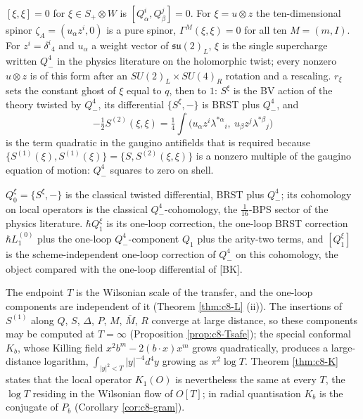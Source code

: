 \begin{remark}
$[\xi,\xi]=0$ for $\xi\in S_+\otimes W$ is $[Q^i_\alpha,Q^j_\beta]=0$. For $\xi=u\otimes z$ the ten-dimensional spinor $\zeta_A=(u_\alpha z^i,0)$ is a pure spinor, $\Gamma^M(\xi,\xi)=0$ for all ten $M=(m,I)$. For $z^i=\delta^i{}_4$ and $u_\alpha$ a weight vector of $\mathfrak{su}(2)_L$, $\xi$ is the single supercharge written $Q^4_-$ in the physics literature on the holomorphic twist; every nonzero $u\otimes z$ is of this form after an $SU(2)_L\times SU(4)_R$ rotation and a rescaling. $r_\xi$ sets the constant ghost of $\xi$ equal to $q$, then to $1$: $S^\xi$ is the BV action of the theory twisted by $Q^4_-$, its differential $\{S^\xi,-\}$ is BRST plus $Q^4_-$, and
\[
-\tfrac12S^{(2)}(\xi,\xi)=\tfrac14\int\big(u_\alpha z^i\lambda^{*\alpha}{}_i,\ u_\beta z^j\lambda^{*\beta}{}_j\big)
\]
is the term quadratic in the gaugino antifields that is required because $\{S^{(1)}(\xi),S^{(1)}(\xi)\}=\{S,S^{(2)}(\xi,\xi)\}$ is a nonzero multiple of the gaugino equation of motion: $Q^4_-$ squares to zero on shell.
\end{remark}

\begin{remark}
$Q^\xi_0=\{S^\xi,-\}$ is the classical twisted differential, BRST plus $Q^4_-$; its cohomology on local operators is the classical $Q^4_-$-cohomology, the $\tfrac1{16}$-BPS sector of the physics literature. $\hbar Q^\xi_1$ is its one-loop correction, the one-loop BRST correction $\hbar L_1^{(0)}$ plus the one-loop $Q^4_-$-component $Q_1$ plus the arity-two terms, and $[Q^\xi_1]$ is the scheme-independent one-loop correction of $Q^4_-$ on this cohomology, the object compared with the one-loop differential of [BK].
\end{remark}

\begin{remark}
The endpoint $T$ is the Wilsonian scale of the transfer, and the one-loop components are independent of it (Theorem \ref{thm:c8-L} (ii)). The insertions of $S^{(1)}$ along $Q$, $S$, $\Delta$, $P$, $M$, $\bar M$, $R$ converge at large distance, so these components may be computed at $T=\infty$ (Proposition \ref{prop:c8-Tsafe}); the special conformal $K_b$, whose Killing field $x^2b^m-2(b\cdot x)x^m$ grows quadratically, produces a large-distance logarithm, $\int_{|y|^2<T}|y|^{-4}d^4y$ growing as $\pi^2\log T$. Theorem \ref{thm:c8-K} states that the local operator $K_1(O)$ is nevertheless the same at every $T$, the $\log T$ residing in the Wilsonian flow of $O[T]$; in radial quantisation $K_b$ is the conjugate of $P_b$ (Corollary \ref{cor:c8-gram}).
\end{remark}

